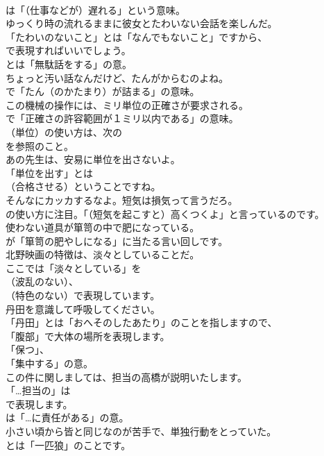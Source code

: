 \documentclass[8pt]{extreport}
\begin{document}
\begin{CJK}{UTF8}{min}
\\	は「（仕事などが）遅れる」という意味。	
\\	ゆっくり時の流れるままに彼女とたわいない会話を楽しんだ。 
\\	「たわいのないこと」とは「なんでもないこと」ですから、
\\	で表現すればいいでしょう。
\\	とは「無駄話をする」の意。	
\\	ちょっと汚い話なんだけど、たんがからむのよね。 
\\	で「たん（のかたまり）が詰まる」の意味。	
\\	この機械の操作には、ミリ単位の正確さが要求される。 
\\	で「正確さの許容範囲が１ミリ以内である」の意味。
\\	（単位）の使い方は、次の
\\	を参照のこと。	
\\	あの先生は、安易に単位を出さないよ。 
\\	「単位を出す」とは 
\\	（合格させる）ということですね。	
\\	そんなにカッカするなよ。短気は損気って言うだろ。 
\\	の使い方に注目。「（短気を起こすと）高くつくよ」と言っているのです。	
\\	使わない道具が箪笥の中で肥になっている。 
\\	が「箪笥の肥やしになる」に当たる言い回しです。	
\\	北野映画の特徴は、淡々としていることだ。 
\\	ここでは「淡々としている」を 
\\	（波乱のない）、
\\	（特色のない）で表現しています。	
\\	丹田を意識して呼吸してください。 
\\	「丹田」とは「おへそのしたあたり」のことを指しますので、
\\	「腹部」で大体の場所を表現します。
\\	「保つ」、
\\	「集中する」の意。	
\\	この件に関しましては、担当の高橋が説明いたします。 
\\	「…担当の」は 
\\	で表現します。
\\	は「…に責任がある」の意。	
\\	小さい頃から皆と同じなのが苦手で、単独行動をとっていた。 
\\	とは「一匹狼」のことです。

\end{CJK}
\end{document}
